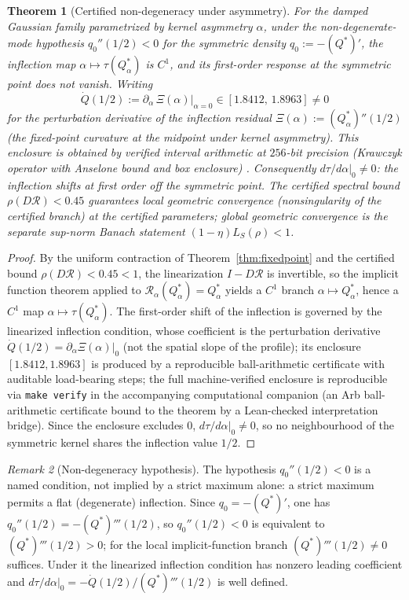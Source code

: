 \documentclass[11pt]{article}
\theoremstyle{plain}
\newtheorem{theorem}{Theorem}[section]
\theoremstyle{definition}
\theoremstyle{remark}
\newtheorem{remark}[theorem]{Remark}
\newcommand{\Rc}{\mathcal R}
\begin{document}
\begin{theorem}[Certified non-degeneracy under asymmetry]\label{thm:certified}
For the damped Gaussian family parametrized by kernel asymmetry $\alpha$, under the non-degenerate-mode hypothesis $q_0''(1/2)<0$ for the symmetric density $q_0:=-(Q^*)'$, the inflection map $\alpha\mapsto\tau(Q^*_\alpha)$ is $C^1$, and its first-order response at the symmetric point does not vanish. Writing
\[
\dot Q(1/2):=\partial_\alpha\,\Xi(\alpha)\big|_{\alpha=0}\in[1.8412,\,1.8963]\neq0
\]
for the \emph{perturbation derivative} of the inflection residual $\Xi(\alpha):=(Q^*_\alpha)''(1/2)$ (the fixed-point curvature at the midpoint under kernel asymmetry). This enclosure is obtained by verified interval arithmetic at $256$-bit precision (Krawczyk operator with Anselone bound and box enclosure) \citep{johansson2017,rump1999}. Consequently $d\tau/d\alpha|_{0}\neq0$: the inflection shifts at first order off the symmetric point. The certified spectral bound $\rho(D\Rc)<0.45$ guarantees local geometric convergence (nonsingularity of the certified branch) at the certified parameters; global geometric convergence is the separate sup-norm Banach statement $(1-\eta)L_S(\rho)<1$.
\end{theorem}
\begin{proof}
By the uniform contraction of Theorem~\ref{thm:fixedpoint} and the certified bound $\rho(D\Rc)<0.45<1$, the linearization $I-D\Rc$ is invertible, so the implicit function theorem applied to $\Rc_{\alpha}(Q^*_\alpha)=Q^*_\alpha$ yields a $C^1$ branch $\alpha\mapsto Q^*_\alpha$, hence a $C^1$ map $\alpha\mapsto\tau(Q^*_\alpha)$. The first-order shift of the inflection is governed by the linearized inflection condition, whose coefficient is the perturbation derivative $\dot Q(1/2)=\partial_\alpha\Xi(\alpha)|_0$ (not the spatial slope of the profile); its enclosure $[1.8412,1.8963]$ is produced by a reproducible ball-arithmetic certificate with auditable load-bearing steps; the full machine-verified enclosure is reproducible via \texttt{make verify} in the accompanying computational companion (an Arb ball-arithmetic certificate bound to the theorem by a Lean-checked interpretation bridge). Since the enclosure excludes $0$, $d\tau/d\alpha|_0\neq0$, so no neighbourhood of the symmetric kernel shares the inflection value $1/2$.
\end{proof}

\begin{remark}[Non-degeneracy hypothesis]
The hypothesis $q_0''(1/2)<0$ is a named condition, not implied by a strict maximum alone: a strict maximum permits a flat (degenerate) inflection. Since $q_0=-(Q^*)'$, one has $q_0''(1/2)=-(Q^*)'''(1/2)$, so $q_0''(1/2)<0$ is equivalent to $(Q^*)'''(1/2)>0$; for the local implicit-function branch $(Q^*)'''(1/2)\neq0$ suffices. Under it the linearized inflection condition has nonzero leading coefficient and $d\tau/d\alpha|_0=-\dot Q(1/2)/(Q^*)'''(1/2)$ is well defined.
\end{remark}
\end{document}
